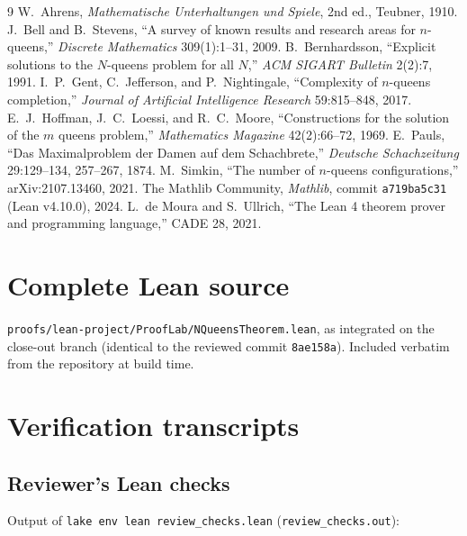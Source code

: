 \documentclass[11pt,a4paper]{article}
\theoremstyle{definition}
\theoremstyle{remark}
\begin{document}
\begin{thebibliography}{9}
 W.~Ahrens, \emph{Mathematische Unterhaltungen und Spiele}, 2nd ed., Teubner, 1910.
 J.~Bell and B.~Stevens, ``A survey of known results and research areas for $n$-queens,'' \emph{Discrete Mathematics} 309(1):1--31, 2009.
 B.~Bernhardsson, ``Explicit solutions to the $N$-queens problem for all $N$,'' \emph{ACM SIGART Bulletin} 2(2):7, 1991.
 I.~P.~Gent, C.~Jefferson, and P.~Nightingale, ``Complexity of $n$-queens completion,'' \emph{Journal of Artificial Intelligence Research} 59:815--848, 2017.
 E.~J.~Hoffman, J.~C.~Loessi, and R.~C.~Moore, ``Constructions for the solution of the $m$ queens problem,'' \emph{Mathematics Magazine} 42(2):66--72, 1969.
 E.~Pauls, ``Das Maximalproblem der Damen auf dem Schachbrete,'' \emph{Deutsche Schachzeitung} 29:129--134, 257--267, 1874.
 M.~Simkin, ``The number of $n$-queens configurations,'' arXiv:2107.13460, 2021.
 The Mathlib Community, \emph{Mathlib}, commit \texttt{a719ba5c31} (Lean v4.10.0), 2024.
 L.~de Moura and S.~Ullrich, ``The Lean 4 theorem prover and programming language,'' CADE 28, 2021.
\end{thebibliography}

\appendix

\section{Complete Lean source}
\label{app:lean}
\texttt{proofs/lean-project/ProofLab/NQueensTheorem.lean}, as integrated on the close-out
branch (identical to the reviewed commit \texttt{8ae158a}). Included verbatim from the
repository at build time.


\section{Verification transcripts}
\label{app:transcripts}

\subsection{Reviewer's Lean checks}
Output of \texttt{lake env lean review\_checks.lean} (\texttt{review\_checks.out}):
\end{document}
